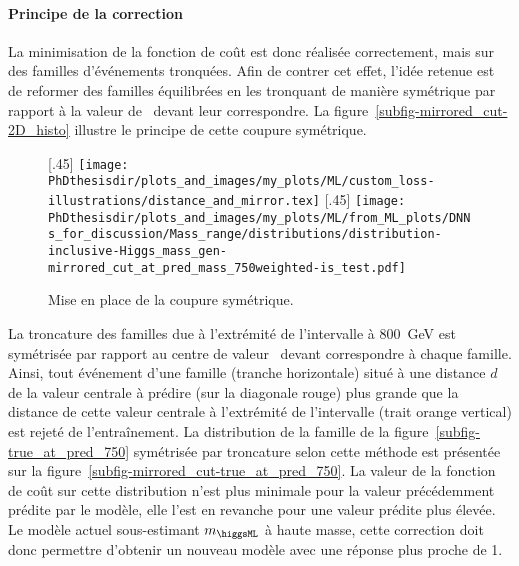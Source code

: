 \paragraph{Principe de la correction}
La minimisation de la fonction de coût est donc réalisée correctement, mais sur des familles d'événements tronquées.
Afin de contrer cet effet,
l'idée retenue est de reformer des familles équilibrées
en les tronquant de manière symétrique par rapport à la valeur de \ytrue\ devant leur correspondre.
La figure~\ref{subfig-mirrored_cut-2D_histo} illustre le principe de cette coupure symétrique.
\begin{figure}[h]
\centering

[.45\textwidth]
{\texttt{[image: \\PhDthesisdir/plots\_and\_images/my\_plots/ML/custom\_loss-illustrations/distance\_and\_mirror.tex]}\vspace{-.5\baselineskip}}
\hfill
{}[.45\textwidth]
{\texttt{[image: \\PhDthesisdir/plots\_and\_images/my\_plots/ML/from\_ML\_plots/DNNs\_for\_discussion/Mass\_range/distributions/distribution-inclusive-Higgs\_mass\_gen-mirrored\_cut\_at\_pred\_mass\_750weighted-is\_test.pdf]}\vspace{-.5\baselineskip}}

\caption{Mise en place de la coupure symétrique.}
\label{fig-B-boundaries_effect-mirrored_cut}
\end{figure}
\par
La troncature des familles due à l'extrémité de l'intervalle à \SI{800}{\GeV}
est symétrisée par rapport au centre de valeur \ytrue\ devant correspondre à chaque famille.
Ainsi, tout événement d'une famille (tranche horizontale)
situé à une distance $d$ de la valeur centrale à prédire (sur la diagonale rouge)
plus grande que la distance de cette valeur centrale à
l'extrémité de l'intervalle (trait orange vertical)
est rejeté de l'entraînement.
La distribution de la famille de la figure~\ref{subfig-true_at_pred_750}
symétrisée par troncature selon cette méthode est présentée sur la figure~\ref{subfig-mirrored_cut-true_at_pred_750}.
La valeur de la fonction de coût sur cette distribution n'est plus minimale pour la valeur précédemment prédite par le modèle,
elle l'est en revanche pour une valeur prédite plus élevée.
Le modèle actuel sous-estimant $m_{\higgsML}$ à haute masse,
cette correction doit donc permettre d'obtenir un nouveau modèle avec une réponse plus proche de 1.
